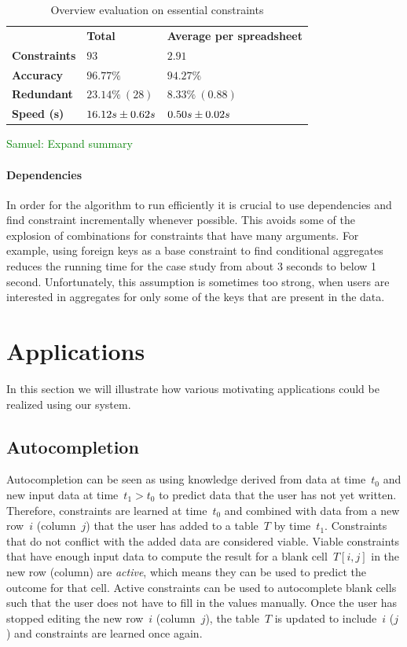 \documentclass{sig-alternate-05-2015}
\newcommand{\samuel}[1]{\textcolor{green}{{\sc Samuel:} #1}\xspace}
\begin{document}
\begin{table}
  \centering
  \begin{tabular}{lll}
    & \textbf{Total} & \textbf{Average per spreadsheet} \\
    \textbf{Constraints} & $93$ & $2.91$ \\
    \textbf{Accuracy} & $96.77\%$ & $94.27\%$ \\
    \textbf{Redundant} & $23.14\%~(28)$ & $8.33\%~(0.88)$ \\
    \textbf{Speed (s)} & ${16.12}s \pm {0.62}s$ & ${0.50}s \pm {0.02}s$
  \end{tabular}
  \caption{Overview evaluation on essential constraints}
\end{table}
\samuel{Expand summary}

\paragraph{Dependencies}
In order for the algorithm to run efficiently it is crucial to use dependencies and find constraint incrementally whenever possible.
This avoids some of the explosion of combinations for constraints that have many arguments.
For example, using foreign keys as a base constraint to find conditional aggregates reduces the running time for the case study from about 3 seconds to below 1 second.
Unfortunately, this assumption is sometimes too strong, when users are interested in aggregates for only some of the keys that are present in the data.

\section{Applications}
In this section we will illustrate how various motivating applications could be realized using our system.

\subsection{Autocompletion}
Autocompletion can be seen as using knowledge derived from data at time~$t_0$ and new input data at time~$t_1 > t_0$ to predict data that the user has not yet written.
Therefore, constraints are learned at time~$t_0$ and combined with data from a new row~$i$ (column~$j$) that the user has added to a table~$T$ by time~$t_1$.
Constraints that do not conflict with the added data are considered viable.
Viable constraints that have enough input data to compute the result for a blank cell~$T[i,j]$ in the new row (column) are \textit{active}, which means they can be used to predict the outcome for that cell.
Active constraints can be used to autocomplete blank cells such that the user does not have to fill in the values manually.
Once the user has stopped editing the new row~$i$ (column~$j$), the table~$T$ is updated to include~$i$ ($j$) and constraints are learned once again.
\end{document}
